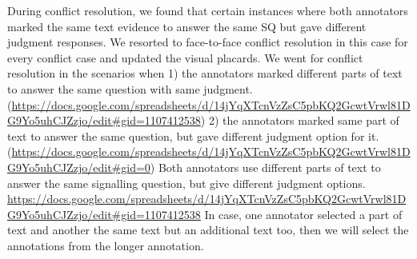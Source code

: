 \documentclass[sn-mathphys,Numbered]{sn-jnl}%
\theoremstyle{thmstyleone}%
\theoremstyle{thmstyletwo}%
\theoremstyle{thmstylethree}%
\begin{document}
During conflict resolution, we found that certain instances where both annotators marked the same text evidence to answer the same SQ but gave different judgment responses.
We resorted to face-to-face conflict resolution in this case for every conflict case and updated the visual placards.
We went for conflict resolution in the scenarios when
1) the annotators marked different parts of text to answer the same question with same judgment. (\url{https://docs.google.com/spreadsheets/d/14jYqXTcnVzZsC5pbKQ2GcwtVrwl81DG9Yo5uhCJZzjo/edit#gid=1107412538})
2) the annotators marked same part of text to answer the same question, but gave different judgment option for it. (\url{https://docs.google.com/spreadsheets/d/14jYqXTcnVzZsC5pbKQ2GcwtVrwl81DG9Yo5uhCJZzjo/edit#gid=0})
Both annotators use different parts of text to answer the same signalling question, but give different judgment options. \url{https://docs.google.com/spreadsheets/d/14jYqXTcnVzZsC5pbKQ2GcwtVrwl81DG9Yo5uhCJZzjo/edit#gid=1107412538}
In case, one annotator selected a part of text and another the same text but an additional text too, then we will select the annotations from the longer annotation.
%
%
%
%
\end{document}
